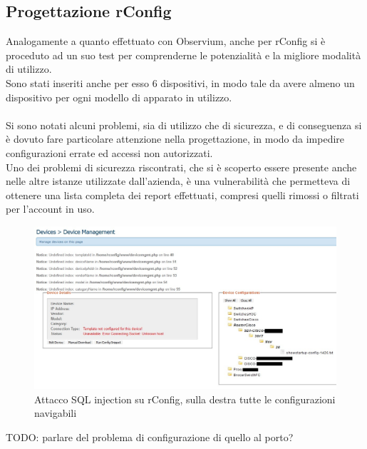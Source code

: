 \documentclass[Tesi.tex]{subfiles}
\begin{document}
\subsection{Progettazione rConfig}
Analogamente a quanto effettuato con Observium, anche per rConfig si è proceduto ad un suo test per comprenderne le potenzialità e la migliore modalità di utilizzo. \\
Sono stati inseriti anche per esso 6 dispositivi, in modo tale da avere almeno un dispositivo per ogni modello di apparato in utilizzo. \\\\
Si sono notati alcuni problemi, sia di utilizzo che di sicurezza, e di conseguenza si è dovuto fare particolare attenzione nella progettazione, in modo da impedire configurazioni errate ed accessi non autorizzati. \\
Uno dei problemi di sicurezza riscontrati, che si è scoperto essere presente anche nelle altre istanze utilizzate dall'azienda, è una vulnerabilità  che permetteva di ottenere una lista completa dei report effettuati, compresi quelli rimossi o filtrati per l'account in uso. \\
\begin{figure}[H]
	\centering
	\includegraphics[width=1\linewidth]{"images/rConfig_SQLi"}
	\caption{Attacco SQL injection su rConfig, sulla destra tutte le configurazioni navigabili}
	\label{fig:Attacco SQL injection su rConfig, sulla destra tutte le configurazioni navigabili}
\end{figure}
TODO: parlare del problema di configurazione di quello al porto?
\end{document}
